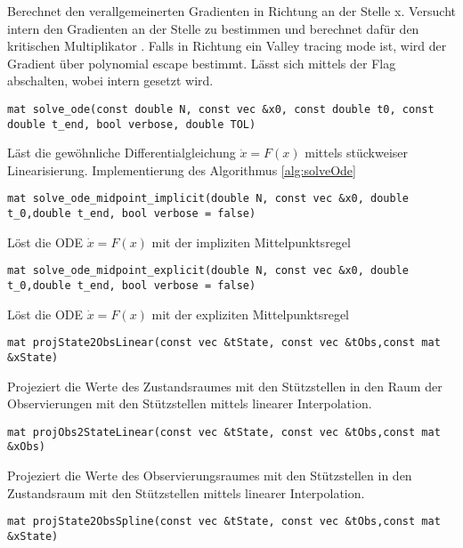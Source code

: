 Berechnet den verallgemeinerten Gradienten in Richtung  an der Stelle \src x. Versucht intern den Gradienten an der Stelle  zu bestimmen und berechnet dafür den kritischen Multiplikator . Falls in Richtung  ein Valley tracing mode ist, wird der Gradient über polynomial escape bestimmt. Lässt sich mittels der Flag  abschalten, wobei intern  gesetzt wird.
\begin{lstlisting}[numbers=none]
mat solve_ode(const double N, const vec &x0, const double t0, const double t_end, bool verbose, double TOL)
\end{lstlisting}
Läst die gewöhnliche Differentialgleichung  $\dot x = F(x)$ mittels stückweiser Linearisierung. Implementierung des Algorithmus \ref{alg:solveOde}
\begin{lstlisting}[numbers=none]
mat solve_ode_midpoint_implicit(double N, const vec &x0, double t_0,double t_end, bool verbose = false)
\end{lstlisting}
Löst die ODE  $\dot x = F(x)$ mit der impliziten Mittelpunktsregel
\begin{lstlisting}[numbers=none]
mat solve_ode_midpoint_explicit(double N, const vec &x0, double t_0,double t_end, bool verbose = false)
\end{lstlisting}
Löst die ODE  $\dot x = F(x)$ mit der expliziten Mittelpunktsregel
\begin{lstlisting}[numbers=none]
mat projState2ObsLinear(const vec &tState, const vec &tObs,const mat &xState)
\end{lstlisting}
Projeziert die Werte  des Zustandsraumes mit den Stützstellen  in den Raum der Observierungen mit den Stützstellen  mittels linearer Interpolation.
\begin{lstlisting}[numbers=none]
mat projObs2StateLinear(const vec &tState, const vec &tObs,const mat &xObs)
\end{lstlisting}
Projeziert die Werte  des Observierungsraumes mit den Stützstellen  in den Zustandsraum mit den Stützstellen  mittels linearer Interpolation.
\begin{lstlisting}[numbers=none]
mat projState2ObsSpline(const vec &tState, const vec &tObs,const mat &xState)
\end{lstlisting}
